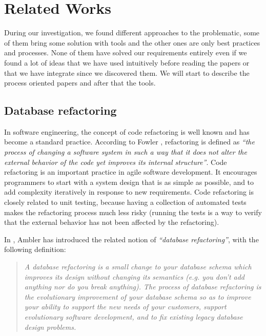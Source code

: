\section{Related Works}


During our investigation, we found different approaches to the problematic, some of them bring some solution with tools and the other ones are only best practices and processes. None of them have solved our requirements entirely even if we found a lot of ideas that we have used intuitively before reading the papers or that we have integrate since we discovered them. We will start to describe the process oriented papers and after that the tools.

\subsection{Database refactoring}

In software engineering, the concept of code refactoring is well known and has become a standard practice. According to Fowler \cite{fowler_evolutionary}, refactoring is defined as \emph{``the process of changing a software system in such a way that it does not alter the external behavior of the code yet improves its internal structure''}. Code refactoring is an important practice in agile software development. It encourages programmers to start with a system design that is as simple as possible, and to add complexity iteratively in response to new requirements. Code refactoring is closely related to unit testing, because having a collection of automated tests makes the refactoring process much less risky (running the tests is a way to verify that the external behavior has not been affected by the refactoring).

In \cite{ambler_process_2011}, Ambler has introduced the related notion of \emph{``database refactoring''}, with the following definition: \begin{quote}\textit{A database refactoring is a small change to your database schema which improves its design without changing its semantics (e.g. you don't add anything nor do you break anything).  The process of database refactoring is the evolutionary improvement of your database schema so as to improve your ability to support the new needs of your customers, support evolutionary software development, and to fix existing legacy database design problems.}\end{quote}

